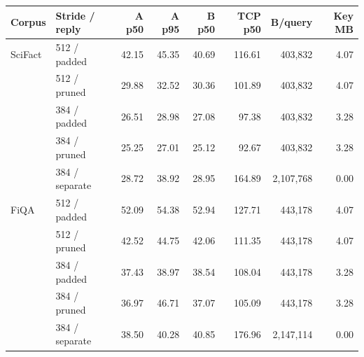 \begin{tabular}{@{}llrrrrrr@{}}
\toprule
Corpus & Stride / reply & A p50 & A p95 & B p50 & TCP p50 & B/query & Key MB \\
\midrule
SciFact & 512 / padded & 42.15 & 45.35 & 40.69 & 116.61 & 403,832 & 4.07 \\
 & 512 / pruned & 29.88 & 32.52 & 30.36 & 101.89 & 403,832 & 4.07 \\
 & 384 / padded & 26.51 & 28.98 & 27.08 & 97.38 & 403,832 & 3.28 \\
 & 384 / pruned & 25.25 & 27.01 & 25.12 & 92.67 & 403,832 & 3.28 \\
 & 384 / separate & 28.72 & 38.92 & 28.95 & 164.89 & 2,107,768 & 0.00 \\
FiQA & 512 / padded & 52.09 & 54.38 & 52.94 & 127.71 & 443,178 & 4.07 \\
 & 512 / pruned & 42.52 & 44.75 & 42.06 & 111.35 & 443,178 & 4.07 \\
 & 384 / padded & 37.43 & 38.97 & 38.54 & 108.04 & 443,178 & 3.28 \\
 & 384 / pruned & 36.97 & 46.71 & 37.07 & 105.09 & 443,178 & 3.28 \\
 & 384 / separate & 38.50 & 40.28 & 40.85 & 176.96 & 2,147,114 & 0.00 \\
\bottomrule
\end{tabular}
